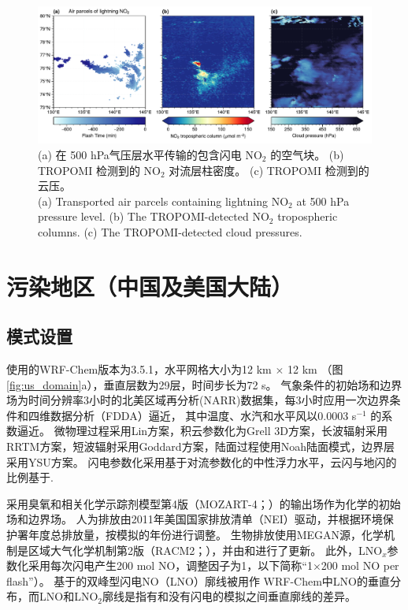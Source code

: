 \begin{figure}[!htbp]
\centering
\includegraphics[width=18cm]{./figures/arctic_large_lno2.pdf}
\caption{
(a) 在 500 hPa气压层水平传输的包含闪电 NO$_2$ 的空气块。
(b) TROPOMI 检测到的 NO$_2$ 对流层柱密度。
(c) TROPOMI 检测到的云压。\\
(a) Transported air parcels containing lightning NO$_2$ at 500 hPa pressure level.
(b) The TROPOMI-detected NO$_2$ tropospheric columns.
(c) The TROPOMI-detected cloud pressures.
}
\label{fig:arctic_large_lno2}
\end{figure}


\section{污染地区（中国及美国大陆）}

\subsection{模式设置} \label{sec:model_settings}

使用的WRF-Chem版本为3.5.1，水平网格大小为12 km $\times$ 12 km （图\ref{fig:us_domain}a），垂直层数为29层，时间步长为72 s。
气象条件的初始场和边界场为时间分辨率3小时的北美区域再分析(NARR)数据集，每3小时应用一次边界条件和四维数据分析（FDDA）逼近，
其中温度、水汽和水平风以0.0003 s$^{-1}$ 的系数逼近\citep{Laughner.2017}。
微物理过程采用Lin方案\citep{Lin.1983}，积云参数化为Grell 3D方案\citep{Grell.1993a,Grell.2002a}，长波辐射采用RRTM方案\citep{Iacono.2008}，短波辐射采用Goddard方案，陆面过程使用Noah陆面模式\citep{Koren.1999}，边界层采用YSU方案\citep{Hong.2006}。
闪电参数化采用基于对流参数化的中性浮力水平\citep{Pickering.1992}，云闪与地闪的比例基于\citet{Boccippio.2001}.

采用臭氧和相关化学示踪剂模型第4版（MOZART-4；\citet{Emmons.2010}）的输出场作为化学的初始场和边界场。
人为排放由2011年美国国家排放清单（NEI）驱动，并根据环境保护署年度总排放量，按模拟的年份进行调整\citep{EPA.2015}。
生物排放使用MEGAN源，化学机制是区域大气化学机制第2版（RACM2；\citet{Goliff.2013}），并由\citet{Browne.2014}和\citet{Schwantes.2015}进行了更新。
此外，LNO$_x$参数化采用每次闪电产生200 mol NO，调整因子为1，以下简称“1$\times$200 mol NO per flash”）。
基于\citet{Ott.2010}的双峰型闪电NO（LNO）廓线\citep{Laughner.2017}被用作 WRF-Chem中LNO的垂直分布，而LNO和LNO$_2$廓线是指有和没有闪电的模拟之间垂直廓线的差异。


